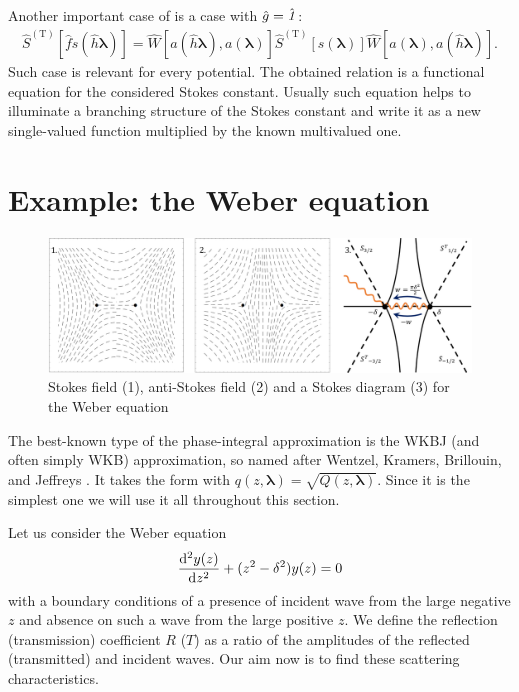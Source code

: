 \documentclass[12pt]{iopart}
\def\S{\widehat{S}}
\def\W{\widehat{W}}
\def\f{\hat{f}}
\def\g{\hat{g}}
\def\h{\hat{h}}
\def\lmbd{\bm{\lambda}}
\def\Tp{\mathrm{T}}
\def\unity{\hat{\it 1}}
\newcommand\phsintgrnd[1][z]{q(#1,\lmbd)}
\begin{document}
Another important case of  is a case with $\g=\unity$:
\begin{eqnarray}
\S^{(\Tp)} \left[ \f s(\h\lmbd) \right] = 
\W \left[ a(\h\lmbd),a(\lmbd) \right]
\S^{(\Tp)} \left[ s(\lmbd) \right]
\W \left[ a(\lmbd),a(\h\lmbd) \right].
\label{eq:func}
\end{eqnarray}
Such case is relevant for every potential. The obtained relation is a functional 
equation for the considered Stokes constant. Usually such equation helps to illuminate 
a branching structure of the Stokes constant and write it as a new single-valued function 
multiplied by the known multivalued one.

\section{Example: the Weber equation \label{sec:weber}}

\begin{figure}
\centering
\noindent
\includegraphics[scale=.5]{stuff/wsd.png}
\caption{Stokes field (1), anti-Stokes field (2) and a Stokes diagram (3) for the Weber equation ~}
\label{fig:wsd}
\end{figure} 

The best-known type of the phase-integral approximation is the WKBJ (and often simply WKB) approximation, 
so named after Wentzel, Kramers, Brillouin, and Jeffreys \cite{wkb1,wkb2,wkb3,wkbj}. 
It takes the form  with $\phsintgrnd = \sqrt{Q(z,\lmbd)}$. Since it is the simplest one
we will use it all throughout this section.

Let us consider the Weber equation
\begin{eqnarray}
\frac{\mathrm{d}^2 y(z)}{\mathrm{d} z^2}+(z^2-\delta^2)y(z)=0
\label{eq:weber}
\end{eqnarray}
with a boundary conditions of a presence of incident wave from the large negative $z$ and absence on such 
a wave from the large positive $z$. We define the reflection (transmission) coefficient $R$ ($T$) as
a ratio of the amplitudes of the reflected (transmitted) and incident waves. 
Our aim now is to find these scattering characteristics.
\end{document}
